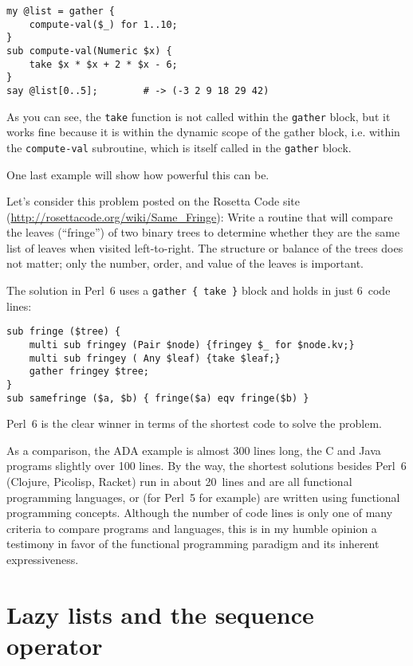 \begin{verbatim}
my @list = gather {
    compute-val($_) for 1..10; 
}
sub compute-val(Numeric $x) {
    take $x * $x + 2 * $x - 6;
}
say @list[0..5];        # -> (-3 2 9 18 29 42)
\end{verbatim}

As you can see, the {\tt take} function is not called 
within the {\tt gather} block, but it works fine because 
it is within the dynamic scope of the gather block, i.e. 
within the {\tt compute-val} subroutine, which is itself 
called in the {\tt gather} block.

One last example will show how powerful this can be.

Let's consider this problem posted on the Rosetta Code 
site (\url{http://rosettacode.org/wiki/Same_Fringe}): 
Write a routine that will compare the leaves (``fringe'') 
of two binary trees to determine whether they are the 
same list of leaves when visited left-to-right. The 
structure or balance of the trees does not matter; 
only the number, order, and value of the leaves is 
important. 

The solution in Perl~6 uses a \verb'gather { take }' 
block and holds in just 6~code lines:

\begin{verbatim}
sub fringe ($tree) {
    multi sub fringey (Pair $node) {fringey $_ for $node.kv;}
    multi sub fringey ( Any $leaf) {take $leaf;}
    gather fringey $tree;
}
sub samefringe ($a, $b) { fringe($a) eqv fringe($b) }
\end{verbatim}

Perl~6 is the clear winner in terms of the shortest code to 
solve the problem.

As a comparison, the ADA example is almost 300 lines long, 
the C and Java programs slightly over 100 lines. By the way, 
the shortest solutions besides Perl~6 (Clojure, Picolisp, 
Racket) run in about 20~lines and are all functional 
programming languages, or (for Perl~5 for example) are 
written using functional programming concepts. 
Although the number of code lines is only one of many 
criteria to compare programs and languages, this is 
in my humble opinion a testimony in favor of the functional 
programming paradigm and its inherent expressiveness.


\section{Lazy lists and the sequence operator}

